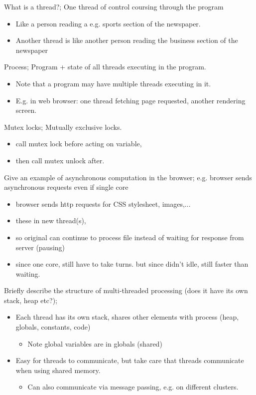 \documentclass{article}
\begin{document}
What is a thread?; One thread of control coursing through the program \begin{itemize} \item Like a person reading a e.g. sports section of the newspaper. \item Another thread is like another person reading the business section of the newspaper \end{itemize}

Process; Program + state of all threads executing in the program. \begin{itemize} \item Note that a program may have multiple threads executing in it. \item E.g. in web browser: one thread fetching page requested, another rendering screen. \end{itemize}

Mutex locks; Mutually exclusive locks. \begin{itemize} \item call mutex lock before acting on variable, \item then call mutex unlock after. \end{itemize}

Give an example of asynchronous computation in the browser; e.g. browser sends asynchronous requests even if single core \begin{itemize} \item browser sends http requests for CSS stylesheet, images,... \item these in new thread(s), \item so original can continue to process file instead of waiting for response from server (pausing) \item since one core, still have to take turns. but since didn't idle, still faster than waiting. \end{itemize}

Briefly describe the structure of multi-threaded processing (does it have its own stack, heap etc?); \begin{itemize} \item Each thread has its own stack, shares other elements with process (heap, globals, constants, code) \begin{itemize} \item Note global variables are in globals (shared) \end{itemize} \item Easy for threads to communicate, but take care that threads communicate when using shared memory. \begin{itemize} \item Can also communicate via message passing, e.g. on different clusters. \end{itemize} \end{itemize}
\end{document}
